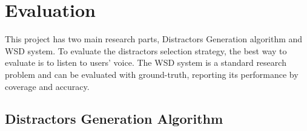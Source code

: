 \section{Evaluation}
This project has two main research parts, Distractors Generation algorithm and WSD system. To evaluate the distractors selection strategy, the best way to evaluate is to listen to users' voice. The WSD system is a standard research problem and can be evaluated with ground-truth, reporting its performance
by coverage and accuracy.
\subsection{Distractors Generation Algorithm}



